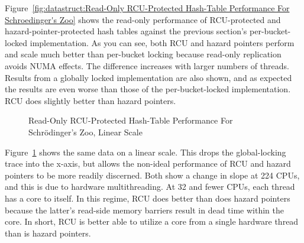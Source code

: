 Figure~\ref{fig:datastruct:Read-Only RCU-Protected Hash-Table Performance For Schroedinger's Zoo}
shows the read-only performance of RCU-protected and hazard-pointer-protected
hash tables against the previous section's per-bucket-locked implementation.
As you can see, both RCU and hazard pointers perform and scale
much better than per-bucket locking because read-only
replication avoids NUMA effects.
The difference increases with larger numbers of threads.
Results from a globally locked implementation are also shown, and as expected
the results are even worse than those of the per-bucket-locked implementation.
RCU does slightly better than hazard pointers.

\begin{figure}[tb]
\centering
{}
\caption{Read-Only RCU-Protected Hash-Table Performance For Schr\"odinger's Zoo, Linear Scale}
\label{fig:datastruct:Read-Only RCU-Protected Hash-Table Performance For Schroedinger's Zoo, Linear Scale}
\end{figure}

Figure~\ref{fig:datastruct:Read-Only RCU-Protected Hash-Table Performance For Schroedinger's Zoo, Linear Scale}
shows the same data on a linear scale.
This drops the global-locking trace into the x-axis, but allows the
non-ideal performance of RCU and hazard pointers to be more readily
discerned.
Both show a change in slope at 224 CPUs, and this is due to hardware
multithreading.
At 32 and fewer CPUs, each thread has a core to itself.
In this regime, RCU does better than does hazard pointers because the
latter's read-side memory barriers result in dead time within the core.
In short, RCU is better able to utilize a core from a single hardware
thread than is hazard pointers.

